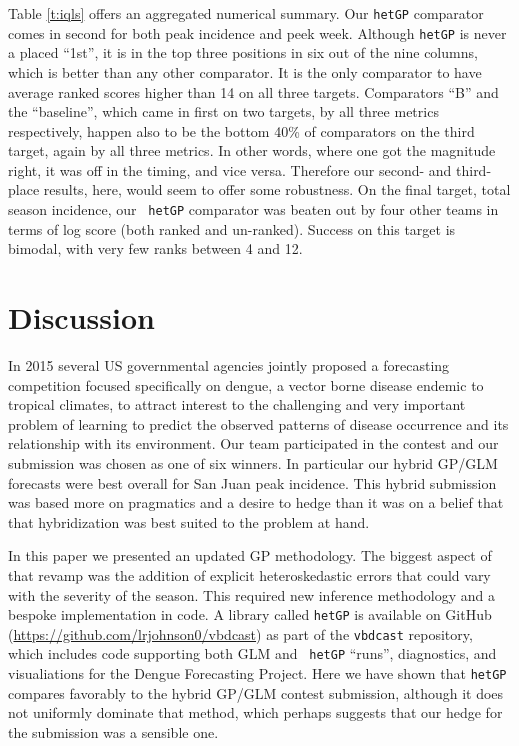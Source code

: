 \documentclass[12pt]{article}
\begin{document}
Table \ref{t:iqls} offers an aggregated numerical summary. Our {\tt hetGP}
comparator comes in second for both peak incidence and peek week. Although
{\tt hetGP} is never a placed ``1st'', it is in the top three positions in six
out of the nine columns, which is better than any other comparator. It is the
only comparator to have average ranked scores higher than 14 on all three
targets. Comparators ``B'' and the ``baseline'', which came in first on two
targets, by all three metrics respectively, happen also to be the bottom 40\%
of comparators on the third target, again by all three metrics.   In other
words, where one got the magnitude right, it was off in the timing, and vice
versa.  Therefore our second- and third-place results, here, would seem to
offer some robustness. On the final target, total season incidence, our {\tt
hetGP} comparator was beaten out by four other teams in terms of log score
(both ranked and un-ranked). Success on this target is bimodal, with very few
ranks between 4 and 12.

\section{Discussion}
\label{sec:discuss}

In 2015 several US governmental agencies jointly proposed a forecasting
competition focused specifically on dengue, a vector borne disease endemic to
tropical climates, to attract interest to the challenging and very important
problem of learning to predict the observed patterns of disease occurrence and
its relationship with its environment.  Our team participated in the contest
and our submission was chosen as one of six winners.  In particular our hybrid
GP/GLM forecasts were best overall for San Juan peak incidence.  This hybrid
submission was based more on pragmatics and a desire to hedge than it was on
a belief that that hybridization was best suited to the problem at hand.

In this paper we presented an updated GP methodology. The biggest aspect of
that revamp was the addition of explicit heteroskedastic errors that could
vary with the severity of the season. This required new inference methodology
and a bespoke implementation in code. A library called {\tt hetGP} is
available on GitHub (\url{https://github.com/lrjohnson0/vbdcast}) as part of
the {\tt vbdcast} repository, which includes code supporting both GLM and {\tt
hetGP} ``runs'', diagnostics, and visualiations for the Dengue Forecasting
Project. Here we have shown that {\tt hetGP} compares favorably to the hybrid
GP/GLM contest submission, although it does not uniformly dominate that
method, which perhaps suggests that our hedge for the submission was a
sensible one.
\end{document}
